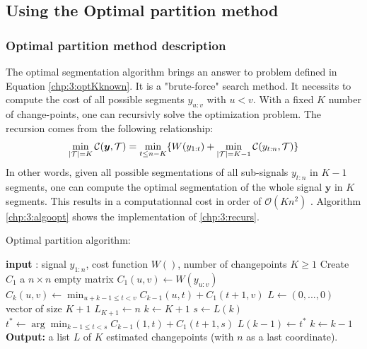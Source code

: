 \subsection{Using the Optimal partition method}

\subsubsection{Optimal partition method description}

The optimal segmentation algorithm brings an answer to problem defined in Equation \ref{chp:3:optKknown}. It is a "brute-force" search method. It necessits to compute the cost of all possible segments $y_{u:v}$ with $u<v$.  With a fixed $K$ number of change-points, one can recursivly solve the optimization problem. The recursion comes from the following relationship: 
\begin{equation}\label{chp:3:recurs}
\min_{\lvert{\mathcal T}\rvert = K}\mathcal{C}(\bm y, {\mathcal T}) = \min_{t \leq n-K}\{W(y_{1:t})+\min_{\lvert{\mathcal T}\rvert = K-1}\mathcal{C}(y_{t:n},{\mathcal T})\} 
\end{equation}
In other words, given all possible segmentations of all sub-signals $y_{t:n}$ in $K-1$ segments, one can compute the optimal segmentation of the whole signal $\bm y$ in $K$ segments. This results in a computationnal cost in order of $\mathcal{O}(Kn^2)$ \citep{haynes2017}. Algorithm \ref{chp:3:algoopt} shows the implementation of \ref{chp:3:recurs}. 

\begin{algorithm}[ht]
\caption{Optimal partition algorithm:}\label{chp:3:algoopt}
\begin{algorithmic}

\State \textbf{input} : signal $y_{1:n}$, cost function $W()$, number of changepoints $K \geq 1$
\State Create $C_1$ a $n\times n$ empty matrix
  \State $C_1(u,v) \gets W(y_{u:v})$
\EndFor
{}
      \State $C_k(u,v) \gets \min_{u+k-1 \leq t < v} C_{k-1}(u,t) + C_1(t+1,v)$ 
    \EndFor
  \EndFor
\EndIf
\State $L \gets (0,...,0)$ vector of size $K+1$
\State $L_{K+1} \gets n$
\State $k \gets K+1$
  \State $s \gets L(k)$
  \State $t^* \gets \arg\min_{k-1\leq t < s}C_{k-1}(1,t)+C_1(t+1,s)$
  \State $L(k-1) \gets t^*$
  \State $k \gets k-1$
\EndWhile
\State \textbf{Output:} a list $L$ of $K$ estimated changepoints (with $n$ as a last coordinate).
\end{algorithmic}
\end{algorithm} 

